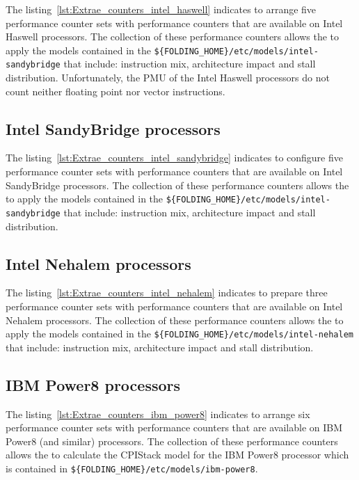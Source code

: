

The listing~\ref{lst:Extrae_counters_intel_haswell} indicates \EXTRAE to arrange five performance counter sets with performance counters that are available on Intel Haswell processors.
The collection of these performance counters allows the \FOLDING to apply the models contained in the \texttt{\$\{FOLDING\_HOME\}/etc/models/intel-sandybridge} that include: instruction mix, architecture impact and stall distribution.
Unfortunately, the PMU of the Intel Haswell processors do not count neither floating point nor vector instructions.

\subsection{Intel SandyBridge processors}



The listing~\ref{lst:Extrae_counters_intel_sandybridge} indicates \EXTRAE to configure five performance counter sets with performance counters that are available on Intel SandyBridge processors.
The collection of these performance counters allows the \FOLDING to apply the models contained in the \texttt{\$\{FOLDING\_HOME\}/etc/models/intel-sandybridge} that include: instruction mix, architecture impact and stall distribution.

\subsection{Intel Nehalem processors}



The listing~\ref{lst:Extrae_counters_intel_nehalem} indicates \EXTRAE to prepare three performance counter sets with performance counters that are available on Intel Nehalem processors.
The collection of these performance counters allows the \FOLDING to apply the models contained in the \texttt{\$\{FOLDING\_HOME\}/etc/models/intel-nehalem} that include: instruction mix, architecture impact and stall distribution.

\subsection{IBM Power8 processors}



The listing~\ref{lst:Extrae_counters_ibm_power8} indicates \EXTRAE to arrange six performance counter sets with performance counters that are available on IBM Power8 (and similar) processors.
The collection of these performance counters allows the \FOLDING to calculate the CPIStack model for the IBM Power8 processor which is contained in \texttt{\$\{FOLDING\_HOME\}/etc/models/ibm-power8}.


